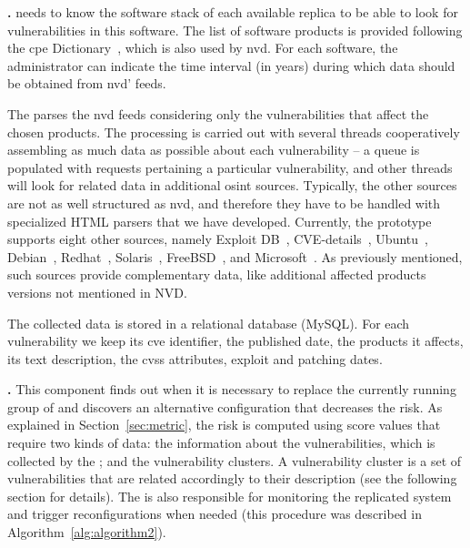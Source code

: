  \textbf{\fetcher.} \system needs to know the software stack of each available replica to be able to look for vulnerabilities in this software.
The list of software products is provided following the \gls{cpe} Dictionary~\cite{cpe}, which is also used by \gls{nvd}. 
For each software, the administrator can indicate the time interval (in years) during which data should be obtained from \gls{nvd}' feeds.

The \fetcher parses the \gls{nvd} feeds considering only the vulnerabilities that affect the chosen products. 
The processing is carried out with several threads cooperatively assembling as much data as possible about each vulnerability -- a queue is populated with requests pertaining a particular vulnerability, and other threads will look for related data in additional \gls{osint} sources. 
Typically, the other sources are not as well structured as \gls{nvd}, and therefore they have to be handled with specialized HTML parsers that we have developed. 
Currently, the prototype supports eight other sources, namely Exploit DB~\cite{edb}, CVE-details~\cite{cvedetails}, Ubuntu~\cite{ubuntu}, Debian~\cite{debian}, Redhat~\cite{redhat}, Solaris~\cite{solaris}, FreeBSD~\cite{freebsd}, and Microsoft~\cite{microsoft}. 
As previously mentioned, such sources provide complementary data, like additional affected products versions not mentioned in NVD.

The collected data is stored in a relational database (MySQL).
For each vulnerability we keep its \gls{cve} identifier, the published date, the products it affects, its text description, the \gls{cvss} attributes, exploit and patching dates.

 \textbf{\risk.} This component finds out when it is necessary to replace the currently running group of \replicas and discovers an alternative configuration that decreases the risk. 
As explained in Section~\ref{sec:metric}, the risk is computed using score values that require two kinds of data: the information about the vulnerabilities, which is collected by the \fetcher; and the vulnerability clusters. 
A vulnerability cluster is a set of vulnerabilities that are related accordingly to their description (see the following section for details).
The \risk is also responsible for monitoring the replicated system and trigger reconfigurations when needed (this procedure was described in Algorithm~\ref{alg:algorithm2}).


